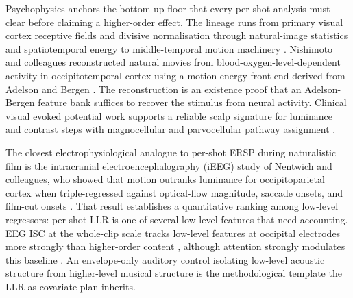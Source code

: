 \documentclass[preprint,12pt]{elsarticle}
\begin{document}
Psychophysics anchors the bottom-up floor that every per-shot analysis must clear before claiming a higher-order effect. The lineage runs from primary visual cortex receptive fields \cite{Hubel1962ReceptiveFB} and divisive normalisation \cite{Carandini2011NormalizationAA} through natural-image statistics and spatiotemporal energy \cite{Bell1997TheC,Simoncelli2001NaturalIS,Adelson1985SpatiotemporalEM} to middle-temporal motion machinery \cite{Born2005StructureAF,Bartels2008NaturalVR}. Nishimoto and colleagues reconstructed natural movies from blood-oxygen-level-dependent activity in occipitotemporal cortex using a motion-energy front end derived from Adelson and Bergen \cite{Nishimoto2011ReconstructingVE}. The reconstruction is an existence proof that an Adelson-Bergen feature bank suffices to recover the stimulus from neural activity. Clinical visual evoked potential work supports a reliable scalp signature for luminance and contrast steps with magnocellular and parvocellular pathway assignment \cite{Tobimatsu2006StudiesOH}.

The closest electrophysiological analogue to per-shot ERSP during naturalistic film is the intracranial electroencephalography (iEEG) study of Nentwich and colleagues, who showed that motion outranks luminance for occipitoparietal cortex when triple-regressed against optical-flow magnitude, saccade onsets, and film-cut onsets \cite{Nentwich2023SemanticNM}. That result establishes a quantitative ranking among low-level regressors: per-shot LLR is one of several low-level features that need accounting. EEG ISC at the whole-clip scale tracks low-level features at occipital electrodes more strongly than higher-order content \cite{dmochowski2012correlated,Madsen2022CognitivePO,Cohen2016MemorableAN}, although attention strongly modulates this baseline \cite{Ki2016AttentionSM}. An envelope-only auditory control isolating low-level acoustic structure from higher-level musical structure \cite{Kaneshiro2021InterSubjectEC} is the methodological template the LLR-as-covariate plan inherits.
\end{document}
